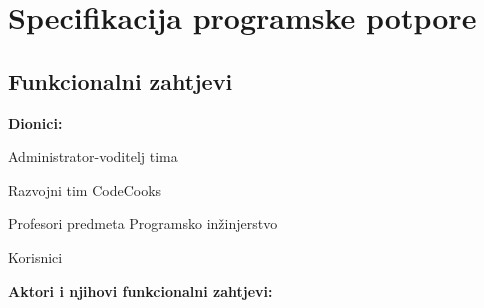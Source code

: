 \chapter{Specifikacija programske potpore}
		
	\section{Funkcionalni zahtjevi}
	
			\noindent \textbf{Dionici:}
			
			\begin{packed_enum}
				
				\item Administrator-voditelj tima
				\item Razvojni tim CodeCooks			
				\item Profesori predmeta Programsko inžinjerstvo
				\item Korisnici
				
			\end{packed_enum}
			
			\noindent \textbf{Aktori i njihovi funkcionalni zahtjevi:}
			
